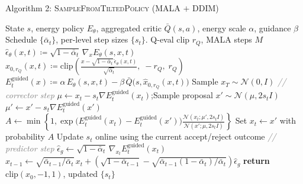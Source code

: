 \documentclass[aspectratio=169,11pt]{beamer}
\begin{document}
\begin{frame}{Algorithm 2: \textsc{SampleFromTiltedPolicy} (MALA $+$ DDIM)}
\small
\begin{fitcenter}
\begin{algorithmic}[1]
\REQUIRE State $s$, energy policy $E_\theta$, aggregated critic $\bar Q(s,a)$, energy scale $\alpha$, guidance $\beta$
\REQUIRE Schedule $\{\bar\alpha_t\}$, per-level step sizes $\{s_t\}$.
\REQUIRE Q-eval clip $r_Q$, MALA steps $M$
\STATE $\hat\epsilon_\theta(x,t)\coloneqq\sqrt{1{-}\bar\alpha_t}\,\nabla_x E_\theta(s,x,t)$
\STATE $\hat x_{0,r_Q}(x,t)\coloneqq \mathrm{clip}\!\left(\tfrac{x-\sqrt{1{-}\bar\alpha_t}\,\hat\epsilon_\theta(x,t)}{\sqrt{\bar\alpha_t}},\;{-}r_Q,\;r_Q\right)$
\STATE $E_t^{\mathrm{guided}}(x)\coloneqq \alpha\,E_\theta(s,x,t)-\beta\,\bar Q\bigl(s,\hat x_{0,r_Q}(x,t)\bigr)$
\STATE Sample $x_T\sim\mathcal{N}(0,I)$
  \STATE \textcolor{gray}{\textit{// corrector step}}
    \STATE $\mu\leftarrow x_t-s_t\nabla E_t^{\mathrm{guided}}(x_t)$;\quad Sample proposal $x'\sim\mathcal{N}(\mu,2s_tI)$ 
    \STATE $\mu'\leftarrow x'-s_t\nabla E_t^{\mathrm{guided}}(x')$ 
    \STATE $A\leftarrow\min\!\left\{1,\exp\!\bigl(E_t^{\mathrm{guided}}(x_t)-E_t^{\mathrm{guided}}(x')\bigr)\tfrac{\mathcal{N}(x_t;\mu',2s_tI)}{\mathcal{N}(x';\mu,2s_tI)}\right\}$ 
    \STATE Set $x_t\leftarrow x'$  with probability $A$ 
    \STATE Update $s_t$ online using the current accept/reject outcome 
  \ENDFOR
  \STATE \textcolor{gray}{\textit{// predictor step}}
  \STATE $\hat\epsilon_g\leftarrow\sqrt{1{-}\bar\alpha_t}\,\nabla_{x_t}E_t^{\mathrm{guided}}(x_t)$
  \STATE $x_{t-1}\leftarrow\sqrt{\bar\alpha_{t-1}/\bar\alpha_t}\,x_t + \left(\sqrt{1{-}\bar\alpha_{t-1}}-\sqrt{\bar\alpha_{t-1}(1{-}\bar\alpha_t)/\bar\alpha_t}\right)\hat\epsilon_g$ 
\ENDFOR
\STATE \textbf{return} $\mathrm{clip}(x_0,{-}1,1)$, updated $\{s_t\}$
\end{algorithmic}
\end{fitcenter}
\end{frame}
\end{document}
